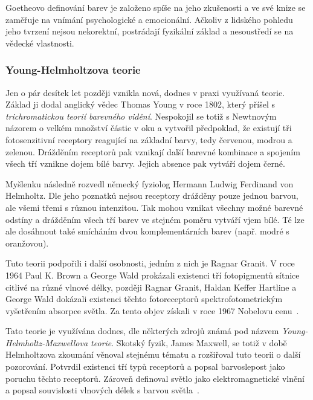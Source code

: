 Goetheovo definování barev je založeno spíše na jeho zkušenosti a ve své knize se zaměřuje na vnímání psychologické a emocionální.
Ačkoliv z lidského pohledu jeho tvrzení nejsou nekorektní, postrádají fyzikální základ a nesoustředí se na vědecké vlastnosti. 

\subsubsection{Young-Helmholtzova teorie}
Jen o pár desítek let později vznikla nová, dodnes v praxi využívaná teorie. Základ ji dodal anglický vědec Thomas Young v roce 1802, který
příšel s \emph{trichromatickou teorií barevného vidění}. Nespokojil se totiž s Newtnovým názorem o velkém množství částic v oku a vytvořil
předpoklad, že existují tři fotosenzitivní receptory reagující na základní barvy, tedy červenou, modrou a zelenou. Drážděním receptorů pak 
vznikají další barevné kombinace a spojením všech tří vznikne dojem bílé barvy. Jejich absence pak vytváří dojem černé.

Myšlenku následně rozvedl německý fyziolog Hermann Ludwig Ferdinand von Helmholtz. Dle jeho poznatků nejsou receptory drážděny pouze jednou barvou,
ale všemi třemi s různou intenzitou. Tak mohou vznikat všechny možné barevné odstíny a drážděním všech tří barev ve stejném poměru vytváří vjem bílé.
Té lze ale dosáhnout také smícháním dvou komplementárních barev (např. modré s oranžovou).

Tuto teorii podpořili i další osobnosti, jedním z nich je Ragnar Granit. V roce 1964 Paul K. Brown a George Wald prokázali existenci tří fotopigmentů sítnice citlivé
na různé vlnové délky, později Ragnar Granit, Haldan Keffer Hartline a George Wald dokázali existenci těchto fotoreceptorů spektrofotometrickým vyšetřením
absorpce světla. Za tento objev získali v roce 1967 Nobelovu cenu~\cite{vackova2013teorie}.

Tato teorie je využívána dodnes, dle některých zdrojů známá pod názvem \emph{Young-Helmholtz-Maxwellova teorie}. Skotský fyzik, James Maxwell, se totiž v době Helmholtzova zkoumání věnoval stejnému
tématu a rozšiřoval tuto teorii o další pozorování. Potvrdil existenci tří typů receptorů a popsal barvoslepost jako poruchu těchto receptorů. Zároveň definoval světlo jako
elektromagnetické vlnění a popsal souvislosti vlnových délek s barvou světla~\cite{958782}.


